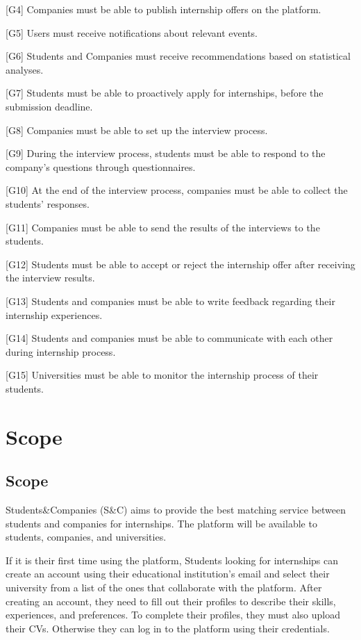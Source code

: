 [G4] Companies must be able to publish internship offers on the platform.

[G5] Users must receive notifications about relevant events.

[G6] Students and Companies must receive recommendations based on statistical analyses.

[G7] Students must be able to proactively apply for internships, before the submission deadline.

[G8] Companies must be able to set up the interview process.

[G9] During the interview process, students must be able to respond to the company's questions through questionnaires.

[G10] At the end of the interview process, companies must be able to collect the students' responses.

[G11] Companies must be able to send the results of the interviews to the students.

[G12] Students must be able to accept or reject the internship offer after receiving the interview results.

[G13] Students and companies must be able to write feedback regarding their internship experiences.

[G14] Students and companies must be able to communicate with each other during internship process.

[G15] Universities must be able to monitor the internship process of their students.


\newpage
\section{Scope}\label{sec:scope}
\subsection{Scope}\label{subsec:scope}
Students\&Companies (S\&C) aims to provide the best matching service between students and companies for internships. The platform will be available
to students, companies, and universities.

If it is their first time using the platform, Students looking for internships can create an account using their educational institution's email and 
select their university from a list of the ones that collaborate with the platform. 
After creating an account, they need to fill out their profiles to describe their skills, experiences, and preferences. To complete
their profiles, they must also upload their CVs.
Otherwise they can log in to the platform using their credentials.


